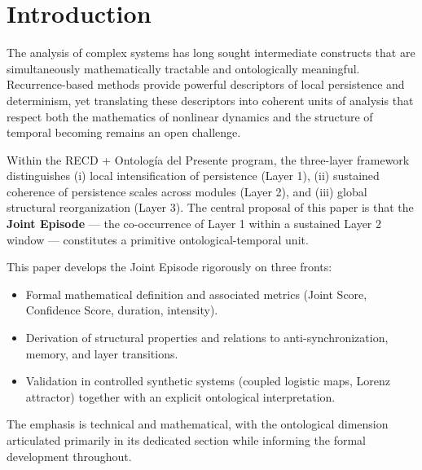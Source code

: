 \section{Introduction}

The analysis of complex systems has long sought intermediate constructs that are simultaneously mathematically tractable and ontologically meaningful. Recurrence-based methods provide powerful descriptors of local persistence and determinism, yet translating these descriptors into coherent units of analysis that respect both the mathematics of nonlinear dynamics and the structure of temporal becoming remains an open challenge.

Within the RECD + Ontología del Presente program, the three-layer framework distinguishes (i) local intensification of persistence (Layer 1), (ii) sustained coherence of persistence scales across modules (Layer 2), and (iii) global structural reorganization (Layer 3). The central proposal of this paper is that the \textbf{Joint Episode} — the co-occurrence of Layer 1 within a sustained Layer 2 window — constitutes a primitive ontological-temporal unit.

This paper develops the Joint Episode rigorously on three fronts:
\begin{itemize}
    \item Formal mathematical definition and associated metrics (Joint Score, Confidence Score, duration, intensity).
    \item Derivation of structural properties and relations to anti-synchronization, memory, and layer transitions.
    \item Validation in controlled synthetic systems (coupled logistic maps, Lorenz attractor) together with an explicit ontological interpretation.
\end{itemize}

The emphasis is technical and mathematical, with the ontological dimension articulated primarily in its dedicated section while informing the formal development throughout.
